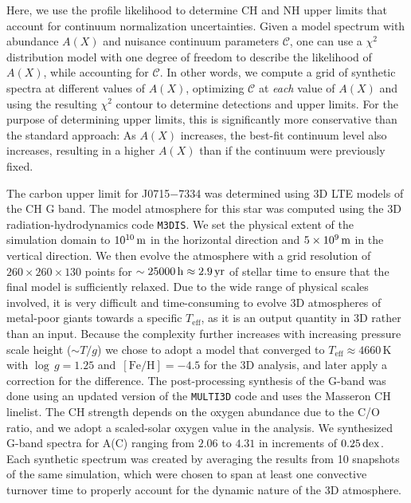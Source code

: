 \documentclass{natureprintstyle}
\newcommand{\unit}[1]{\ensuremath{\mathrm{\,#1}}\xspace}
\newcommand{\feh}{\unit{[Fe/H]}}
\newcommand{\teff}{\ensuremath{T_\mathrm{eff}}\xspace}
\newcommand{\Teff}{\teff}
\newcommand{\logg}{\ensuremath{\log\,g}\xspace}
\newcommand{\umpstar}{J0715$-$7334\xspace}
\begin{document}
Here, we use the profile likelihood\cite{Lampton1976,Feldman1998} to determine CH and NH upper limits that account for continuum normalization uncertainties.
Given a model spectrum with abundance $A(X)$ and nuisance continuum parameters $\mathcal{C}$, one can use a $\chi^2$ distribution model with one degree of freedom to describe the likelihood of $A(X)$, while accounting for $\mathcal{C}$\cite{Wilks1938}. 
In other words, we compute a grid of synthetic spectra at different values of $A(X)$, optimizing $\mathcal{C}$ at \textit{each} value of $A(X)$ and using the resulting $\chi^2$ contour to determine detections and upper limits.
For the purpose of determining upper limits, this is significantly more conservative than the standard approach: As $A(X)$ increases, the best-fit continuum level also increases, resulting in a higher $A(X)$ than if the continuum were previously fixed.

The carbon upper limit for \umpstar was determined using 3D LTE models of the CH G band.
The model atmosphere for this star was computed using the 3D radiation-hydrodynamics code \texttt{M3DIS}\cite{Eitner2024}. We set the physical extent of the simulation domain to $10^{10}\,{\rm m}$ in the horizontal direction and $5\times10^{9}\,{\rm m}$ in the vertical direction. We then evolve the atmosphere with a grid resolution of $260\times260\times130$ points for $\sim 25000\,{\rm h}\approx 2.9\,{\rm yr}$ of stellar time to ensure that the final model is sufficiently relaxed. Due to the wide range of physical scales involved, it is very difficult and time-consuming to evolve 3D atmospheres of metal-poor giants towards a specific $\Teff$, as it is an output quantity in 3D rather than an input. Because the complexity further increases with increasing pressure scale height ($\sim T/g$) we chose to adopt a model that converged to $\Teff \approx 4660$\,K with $\logg=1.25$ and $\feh=-4.5$ for the 3D analysis, and later apply a correction for the difference. The post-processing synthesis of the G-band was done using an updated version of the \texttt{MULTI3D}\cite{Leenaarts2009,Eitner2024} code and uses the Masseron\cite{Masseron2014} CH linelist.
The CH strength depends on the oxygen abundance due to the C/O ratio, and we adopt a scaled-solar oxygen value in the analysis. We synthesized G-band spectra for A(C) ranging from $2.06$ to $4.31$ in increments of $0.25\,{\rm dex}$. Each synthetic spectrum was created by averaging the results from 10 snapshots of the same simulation, which were chosen to span at least one convective turnover time to properly account for the dynamic nature of the 3D atmosphere.
\end{document}
